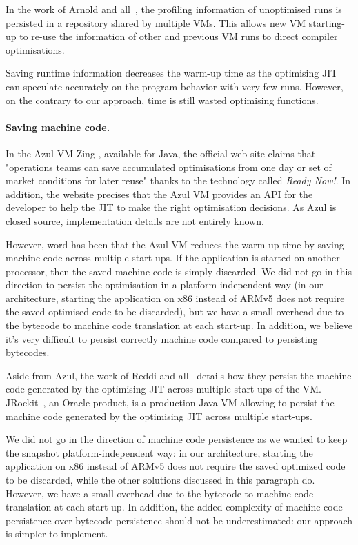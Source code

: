 \documentclass[a4paper,12pt,twoside]{../includes/ThesisStyle}
\begin{document}
In the work of Arnold and all~\cite{Arno05c}, the profiling information of unoptimised runs is persisted in a repository shared by multiple VMs. This allows new VM starting-up to re-use the information of other and previous VM runs to direct compiler optimisations.

Saving runtime information decreases the warm-up time as the optimising JIT can speculate accurately on the program behavior with very few runs. However, on the contrary to our approach, time is still wasted optimising functions.

\paragraph{Saving machine code.}

In the Azul VM Zing \cite{Azul}, available for Java, the official web site claims that "operations teams can save accumulated optimisations from one day or set of market conditions for later reuse" thanks to the technology called \emph{Ready Now!}. In addition, the website precises that the Azul VM provides an API for the developer to help the JIT to make the right optimisation decisions. As Azul is closed source, implementation details are not entirely known. 

However, word has been that the Azul VM reduces the warm-up time by saving machine code across multiple start-ups. If the application is started on another processor, then the saved machine code is simply discarded. We did not go in this direction to persist the optimisation in a platform-independent way (in our architecture, starting the application on x86 instead of ARMv5 does not require the saved optimised code to be discarded), but we have a small overhead due to the bytecode to machine code translation at each start-up. In addition, we believe it's very difficult to persist correctly machine code compared to persisting bytecodes.

Aside from Azul, the work of Reddi and all~\cite{Redd07a} details how they persist the machine code generated by the optimising JIT across multiple start-ups of the VM. JRockit~\cite{JRockit}, an Oracle product, is a production Java VM allowing to persist the machine code generated by the optimising JIT across multiple start-ups.

We did not go in the direction of machine code persistence as we wanted to keep the snapshot platform-independent way: in our architecture, starting the application on x86 instead of ARMv5 does not require the saved optimized code to be discarded, while the other solutions discussed in this paragraph do. However, we have a small overhead due to the bytecode to machine code translation at each start-up. In addition, the added complexity of machine code persistence over bytecode persistence should not be underestimated: our approach is simpler to implement.
\end{document}
